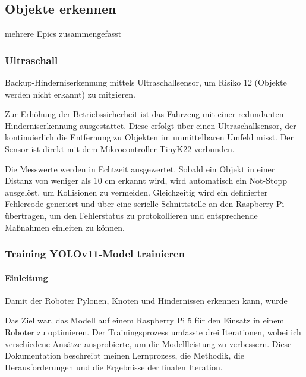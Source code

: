 
\subsection{Objekte erkennen}

mehrere Epics zusammengefasst 

\subsubsection{Ultraschall}
\label{ultraschall}

Backup-Hinderniserkennung mittels Ultraschallsensor, um Risiko 12 (Objekte werden nicht erkannt) zu mitgieren.

Zur Erhöhung der Betriebssicherheit ist das Fahrzeug mit einer redundanten Hinderniserkennung ausgestattet. Diese erfolgt über einen Ultraschallsensor, der kontinuierlich die Entfernung zu Objekten im unmittelbaren Umfeld misst. Der Sensor ist direkt mit dem Mikrocontroller TinyK22 verbunden.

Die Messwerte werden in Echtzeit ausgewertet. Sobald ein Objekt in einer Distanz von weniger als 10 cm erkannt wird, wird automatisch ein Not-Stopp ausgelöst, um Kollisionen zu vermeiden. Gleichzeitig wird ein definierter Fehlercode generiert und über eine serielle Schnittstelle an den Raspberry Pi übertragen, um den Fehlerstatus zu protokollieren und entsprechende Maßnahmen einleiten zu können.




\subsubsection{Training YOLOv11-Model trainieren}

\paragraph{Einleitung}


Damit der Roboter Pylonen, Knoten und Hindernissen erkennen kann, wurde

 Das Ziel war, das Modell auf einem Raspberry Pi 5 für den Einsatz in einem Roboter zu optimieren. Der Trainingsprozess umfasste drei Iterationen, wobei ich verschiedene Ansätze ausprobierte, um die Modellleistung zu verbessern. Diese Dokumentation beschreibt meinen Lernprozess, die Methodik, die Herausforderungen und die Ergebnisse der finalen Iteration.

